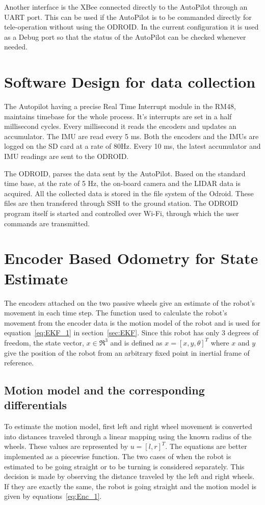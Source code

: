 Another interface is the XBee connected directly to the AutoPilot through an UART port. This can be used if the AutoPilot is to be commanded directly for tele-operation without using the ODROID. In the current configuration it is used as a Debug port so that the status of the AutoPilot can be checked whenever needed. 
\section{Software Design for data collection}
The Autopilot having a precise Real Time Interrupt module in the RM48, maintains timebase for the whole process. It's interrupts are set in a half millisecond cycles. Every millisecond it reads the encoders and updates an accumulator. The IMU are read every 5 ms. Both the encoders and the IMUs are logged on the SD card at a rate of 80Hz. Every 10 ms, the latest accumulator and IMU readings are sent to the ODROID. 

The ODROID, parses the data sent by the AutoPilot. Based on the standard time base, at the rate of 5 Hz, the on-board camera and the LIDAR data is acquired. All the collected data is stored in the file system of the Odroid. These files are then transfered through SSH to the ground station. The ODROID program itself is started and controlled over Wi-Fi, through which the user commands are transmitted. 

\section{Encoder Based Odometry for State Estimate}

The encoders attached on the two passive wheels give an estimate of the robot's movement in each time step. The function used to calculate the robot's movement from the encoder data is the motion model of the robot and is used for equation~\ref{eq:EKF_1} in section~\ref{sec:EKF}. Since this robot has only 3 degrees of freedom, the state vector, $ x \in \Re^3 $ and is defined as $ x = [x,y,\theta]^T $ where $ x $ and $ y $ give the position of the robot from an arbitrary fixed point in inertial frame of reference. 

\subsection{Motion model and the corresponding differentials}

To estimate the motion model, first left and right wheel movement is converted into distances traveled through a linear mapping using the known radius of the wheels. These values are represented by $ u = [ l, r ]^T $. The equations are better implemented as a piecewise function. The two cases of when the robot is estimated to be going straight or to be turning is considered separately. This decision is made by observing the distance traveled by the left and right wheels. If they are exactly the same, the robot is going straight and the motion model is given by equations~\ref{eq:Enc_1}. 

